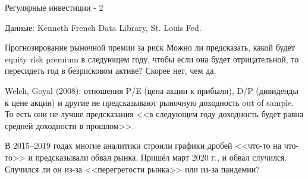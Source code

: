 \documentclass{beamer}
\begin{document}
\begin{frame}{Регулярные инвестиции - 2}
\centering
{}
{\scriptsize Данные: Kenneth French Data Library, St. Louis Fed.}
\end{frame}



\begin{frame}{Прогнозирование рыночной премии за риск}
\justify
Можно ли предсказать, какой будет equity risk premium в следующем году, чтобы 
если она будет отрицательной, то пересидеть год в безрисковом активе? Скорее 
нет, чем да.

\justify
Welch, Goyal (2008): отношения P/E (цена акции к прибыли), D/P (дивиденды к 
цене акции) и другие не предсказывают рыночную доходность out of sample. То 
есть они не лучше предсказания <<в следующем году доходность будет равна 
средней доходности в прошлом>>.

\justify
В 2015--2019 годах многие аналитики строили графики дробей <<что-то на что-то>> 
и предсказывали обвал рынка. Пришёл март 2020 г., и обвал случился. 
Случился ли он из-за <<перегретости рынка>> или из-за пандемии?
\end{frame}
\end{document}

